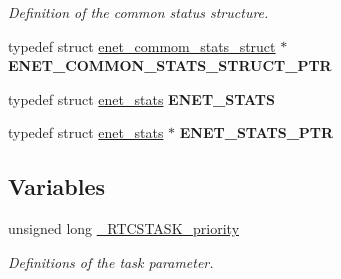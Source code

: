 \begin{DoxyCompactItemize}
\begin{DoxyCompactList}\small\item\em Definition of the common status structure. \end{DoxyCompactList}\item 
typedef struct \hyperlink{structenet__commom__stats__struct}{enet\+\_\+commom\+\_\+stats\+\_\+struct} $\ast$ {\bfseries E\+N\+E\+T\+\_\+\+C\+O\+M\+M\+O\+N\+\_\+\+S\+T\+A\+T\+S\+\_\+\+S\+T\+R\+U\+C\+T\+\_\+\+P\+TR}\hypertarget{group__enet__rtcs__adaptor_ga5bb37bc12f59791be245c9938d7eba6e}{}\label{group__enet__rtcs__adaptor_ga5bb37bc12f59791be245c9938d7eba6e}

\item 
typedef struct \hyperlink{structenet__stats}{enet\+\_\+stats} {\bfseries E\+N\+E\+T\+\_\+\+S\+T\+A\+TS}\hypertarget{group__enet__rtcs__adaptor_gace5a3c6d5569f0de9fbe1bfd645d86a4}{}\label{group__enet__rtcs__adaptor_gace5a3c6d5569f0de9fbe1bfd645d86a4}

\item 
typedef struct \hyperlink{structenet__stats}{enet\+\_\+stats} $\ast$ {\bfseries E\+N\+E\+T\+\_\+\+S\+T\+A\+T\+S\+\_\+\+P\+TR}\hypertarget{group__enet__rtcs__adaptor_gabb4e622ed451495bdc3768b607451288}{}\label{group__enet__rtcs__adaptor_gabb4e622ed451495bdc3768b607451288}

\end{DoxyCompactItemize}
\subsection*{Variables}
\begin{DoxyCompactItemize}
\item 
unsigned long \hyperlink{group__enet__rtcs__adaptor_ga1c9ec93b11e06c426b4f4af6f071d041}{\+\_\+\+R\+T\+C\+S\+T\+A\+S\+K\+\_\+priority}\hypertarget{group__enet__rtcs__adaptor_ga1c9ec93b11e06c426b4f4af6f071d041}{}\label{group__enet__rtcs__adaptor_ga1c9ec93b11e06c426b4f4af6f071d041}

\begin{DoxyCompactList}\small\item\em Definitions of the task parameter. \end{DoxyCompactList}\end{DoxyCompactItemize}

